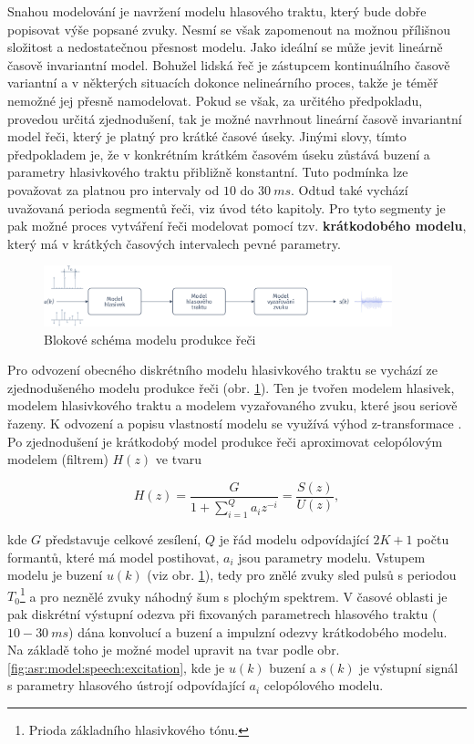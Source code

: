 Snahou modelování je navržení modelu hlasového traktu, který bude dobře popisovat výše popsané zvuky. Nesmí se však zapomenout na možnou přílišnou složitost a nedostatečnou přesnost modelu. Jako ideální se může jevit lineárně časově invariantní model. Bohužel lidská řeč je zástupcem kontinuálního časově variantní a v některých situacích dokonce nelineárního proces, takže je téměř nemožné jej přesně namodelovat. Pokud se však, za určitého předpokladu, provedou určitá zjednodušení, tak je možné navrhnout lineární časově invariantní model řeči, který je platný pro krátké časové úseky. Jinými slovy, tímto předpokladem je, že v konkrétním krátkém časovém úseku zůstává buzení a parametry hlasivkového traktu přibližně konstantní. Tuto podmínka lze považovat za platnou pro intervaly od $10$ do $30\ ms$. Odtud také vychází uvažovaná perioda segmentů řeči, viz úvod této kapitoly. Pro tyto segmenty je pak možné proces vytváření řeči modelovat pomocí tzv. \textbf{krátkodobého modelu}, který má v krátkých časových intervalech pevné parametry. \cite{Holmes2001}

\begin{figure}[hbpt]
  \centering
  \includegraphics[width=0.9\textwidth]{./ch4-asr/img/speech_model.pdf}
  \caption{Blokové schéma modelu produkce řeči}
  \label{fig:asr:model:speech}
\end{figure}

Pro odvození obecného diskrétního modelu hlasivkového traktu se vychází ze zjednodušeného modelu produkce řeči (obr. \ref{fig:asr:model:speech}). Ten je tvořen modelem hlasivek, modelem hlasivkového traktu a modelem vyzařovaného zvuku, které jsou seriově řazeny. K odvození a popisu vlastností modelu se využívá výhod z-transformace \cite{Psutka2006}. Po zjednodušení je krátkodobý model produkce řeči aproximovat celopólovým modelem (filtrem) $H(z)$ ve tvaru

\begin{equation}
  H(z) = \frac{G}{1 + \sum_{i = 1}^{Q} a_{i} z^{-i}} = \frac{S(z)}{U(z)},
  \label{eq:asr:lpc:generic}
\end{equation}

\noindent kde $G$ představuje celkové zesílení, $Q$ je řád modelu odpovídající $2K + 1$ počtu formantů, které má model postihovat, $a_i$ jsou parametry modelu. Vstupem modelu je buzení $u(k)$ (viz obr. \ref{fig:asr:model:speech}), tedy pro znělé zvuky sled pulsů s periodou $T_0$\footnote{Prioda základního hlasivkového tónu.} a pro neznělé zvuky náhodný šum s plochým spektrem. V časové oblasti je pak diskrétní výstupní odezva při fixovaných parametrech hlasového traktu ($10 - 30\ ms$) dána konvolucí a buzení a impulzní odezvy krátkodobého modelu. Na základě toho je možné model upravit na tvar podle obr. \ref{fig:asr:model:speech:excitation}, kde je $u(k)$ buzení a $s(k)$ je výstupní signál s parametry hlasového ústrojí odpovídající $a_i$ celopólového modelu.

